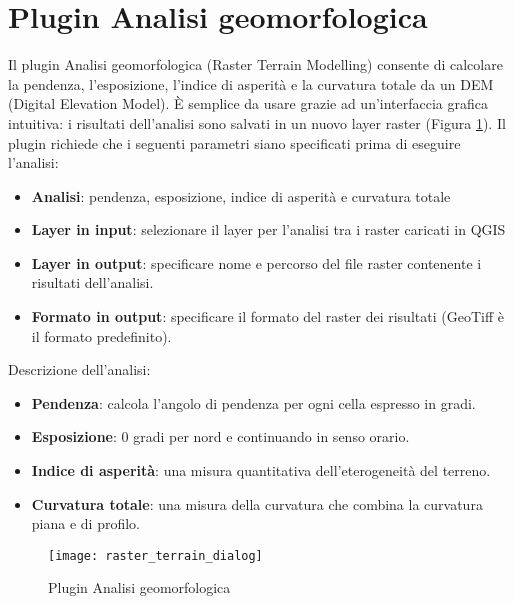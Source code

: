 
\section{Plugin Analisi geomorfologica}\label{sec:rasterrain}


Il plugin Analisi geomorfologica (Raster Terrain Modelling) consente di calcolare la pendenza, l'esposizione, 
l'indice di asperità e la curvatura totale da un DEM (Digital Elevation Model). 
È semplice da usare grazie ad un'interfaccia grafica intuitiva: i risultati dell'analisi sono salvati in 
un nuovo layer raster (Figura \ref{fig:raster_terrain_dialog}).
Il plugin richiede che i seguenti parametri siano specificati prima di eseguire l'analisi:

\begin{itemize}[label=--]
\item \textbf{Analisi}: pendenza, esposizione, indice di asperità e curvatura totale
\item \textbf{Layer in input}: selezionare il layer per l'analisi tra i raster caricati in QGIS 
\item \textbf{Layer in output}: specificare nome e percorso del file raster contenente i risultati dell'analisi.
\item \textbf{Formato in output}: specificare il formato del raster dei risultati (GeoTiff è il formato predefinito).
\end{itemize}

Descrizione dell'analisi:

\begin{itemize}[label=--]
\item \textbf{Pendenza}: calcola l'angolo di pendenza per ogni cella espresso in gradi.
\item \textbf{Esposizione}: 0 gradi per nord e continuando in senso orario.
\item \textbf{Indice di asperità}: una misura quantitativa dell'eterogeneità del terreno.
\item \textbf{Curvatura totale}: una misura della curvatura che combina la curvatura piana e di profilo.
\end{itemize}

\begin{figure}[ht]
   \centering
   \texttt{[image: raster\_terrain\_dialog]}
   \caption{Plugin Analisi geomorfologica \nixcaption}\label{fig:raster_terrain_dialog}
\end{figure}

